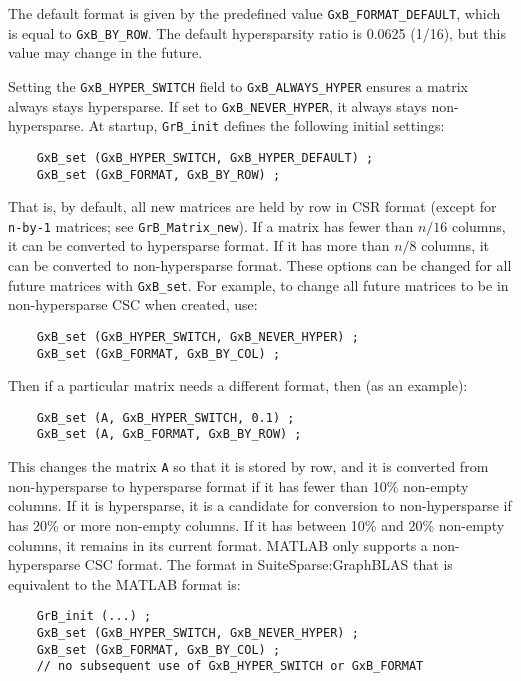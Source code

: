 \documentclass[12pt]{article}
\begin{document}
The default format is given by the predefined value \verb'GxB_FORMAT_DEFAULT',
which is equal to \verb'GxB_BY_ROW'.
The default hypersparsity
ratio is 0.0625 (1/16), but this value may change in the future.

Setting the \verb'GxB_HYPER_SWITCH' field to \verb'GxB_ALWAYS_HYPER' ensures a matrix
always stays hypersparse.  If set to \verb'GxB_NEVER_HYPER', it always stays
non-hypersparse.  At startup, \verb'GrB_init' defines the following initial
settings:

{\footnotesize
\begin{verbatim}
    GxB_set (GxB_HYPER_SWITCH, GxB_HYPER_DEFAULT) ;
    GxB_set (GxB_FORMAT, GxB_BY_ROW) ;
\end{verbatim} }

That is, by default, all new matrices are held by row in CSR format (except
for \verb'n-by-1' matrices; see \verb'GrB_Matrix_new').
If a matrix has fewer than $n/16$
columns, it can be converted to hypersparse format.  If it has more than $n/8$
columns, it can be converted to non-hypersparse format.  These options can be
changed for all future matrices with \verb'GxB_set'.  For example, to change
all future matrices to be in non-hypersparse CSC when created, use:

{\footnotesize
\begin{verbatim}
    GxB_set (GxB_HYPER_SWITCH, GxB_NEVER_HYPER) ;
    GxB_set (GxB_FORMAT, GxB_BY_COL) ;
\end{verbatim} }

Then if a particular matrix needs a different format, then (as an example):

{\footnotesize
\begin{verbatim}
    GxB_set (A, GxB_HYPER_SWITCH, 0.1) ;
    GxB_set (A, GxB_FORMAT, GxB_BY_ROW) ;
\end{verbatim} }

This changes the matrix \verb'A' so that it is stored by row, and it is
converted from non-hypersparse to hypersparse format if it has fewer than 10\%
non-empty columns.  If it is hypersparse, it is a candidate for conversion to
non-hypersparse if has 20\% or more non-empty columns.  If it has between 10\%
and 20\% non-empty columns, it remains in its current format.
MATLAB only supports a non-hypersparse CSC format.  The format in
SuiteSparse:GraphBLAS that is equivalent to the MATLAB format is:

{\footnotesize
\begin{verbatim}
    GrB_init (...) ;
    GxB_set (GxB_HYPER_SWITCH, GxB_NEVER_HYPER) ;
    GxB_set (GxB_FORMAT, GxB_BY_COL) ;
    // no subsequent use of GxB_HYPER_SWITCH or GxB_FORMAT
\end{verbatim} }
\end{document}
